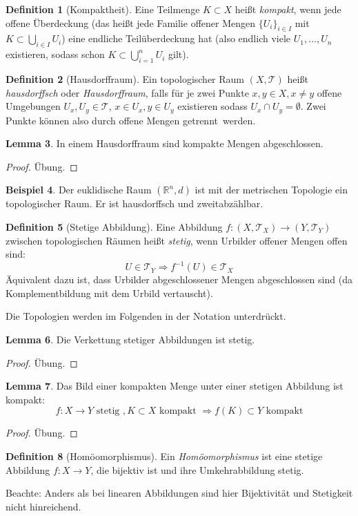 \documentclass[a4paper]{scrreprt}
\numberwithin{equation}{chapter}
\newcommand{\R}{\mathbb{R}}
\theoremstyle{definition}
\newtheorem{defn}{Definition}[section]
\newtheorem{lemma}[defn]{Lemma}
\newtheorem{bsp}[defn]{Beispiel}
\newcommand{\bewUeb}{\begin{proof}Übung.\end{proof}}
\begin{document}
		\begin{defn}[Kompaktheit]
			Eine Teilmenge $K\subset X$ heißt \emph{kompakt}, wenn jede offene Überdeckung (das heißt jede Familie offener Mengen $\lbrace U_i\rbrace_{i\in I}$ mit $K\subset \bigcup_{i\in I}U_i$) eine endliche Teilüberdeckung hat (also endlich viele $U_1,\ldots,U_n$ existieren, sodass schon $K\subset \bigcup_{i=1}^n U_i$ gilt).
		\end{defn}
		\begin{defn}[Hausdorffraum]
			Ein topologischer Raum $(X,\mathcal{T})$ heißt \emph{hausdorffsch} oder \emph{Hausdorffraum}, falls für je zwei Punkte $x,y\in X, x\neq y$ offene Umgebungen ${U_x,U_y\in\mathcal{T}}$, ${x\in U_x}, {y\in U_y}$ existieren sodass $U_x\cap U_y=\emptyset$. Zwei Punkte können also durch offene Mengen \glqq getrennt\grqq\ werden.
		\end{defn}
		\begin{lemma}
			In einem Hausdorffraum sind kompakte Mengen abgeschlossen.
			\bewUeb
		\end{lemma}
		\begin{bsp}
			Der euklidische Raum $(\R^n,d)$ ist mit der metrischen Topologie ein topologischer Raum. Er ist hausdorffsch und zweitabzählbar.
		\end{bsp}
		\begin{defn}[Stetige Abbildung]
			Eine Abbildung $f\colon (X,\mathcal{T}_X)\rightarrow (Y,\mathcal{T}_Y)$ zwischen topologischen Räumen heißt \emph{stetig}, wenn Urbilder offener Mengen offen sind:
			\begin{equation*}
				U\in\mathcal{T}_Y \Rightarrow f^{-1}(U)\in\mathcal{T}_X
			\end{equation*}
			Äquivalent dazu ist, dass Urbilder abgeschlossener Mengen abgeschlossen sind (da Komplementbildung mit dem Urbild vertauscht).
		\end{defn}
		Die Topologien werden im Folgenden in der Notation unterdrückt.
		\begin{lemma}
			Die Verkettung stetiger Abbildungen ist stetig.
			\bewUeb
		\end{lemma}
		\begin{lemma}
			Das Bild einer kompakten Menge unter einer stetigen Abbildung ist kompakt:
			\begin{equation*}
				f\colon X\rightarrow Y \text{ stetig }, K\subset X \text{ kompakt }\Rightarrow f(K)\subset Y \text{ kompakt}
			\end{equation*}
			\bewUeb
		\end{lemma}
		\begin{defn}[Homöomorphismus]
			Ein \emph{Homöomorphismus} ist eine stetige Abbildung $f\colon X\rightarrow Y$, die bijektiv ist und ihre Umkehrabbildung stetig.
			
			Beachte: Anders als bei linearen Abbildungen sind hier Bijektivität und Stetigkeit nicht hinreichend.
		\end{defn}
\end{document}
